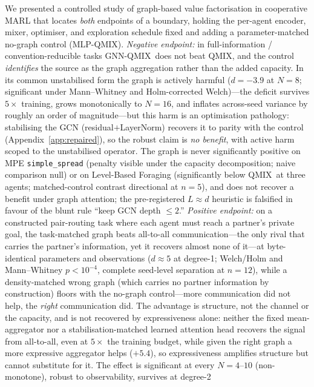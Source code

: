 \documentclass[10pt]{article}
\newcommand{\algoname}[1]{\textsc{#1}}
\newcommand{\qmix}{\algoname{QMIX}}
\newcommand{\gnnqmix}{\algoname{GNN-QMIX}}
\newcommand{\mlpqmix}{\algoname{MLP-QMIX}}
\newcommand{\PEgraphDNeight}{-3.9}    %
\begin{document}
We presented a controlled study of graph-based value factorisation in
cooperative MARL that locates \emph{both} endpoints of a boundary, holding
the per-agent encoder, mixer, optimiser, and exploration schedule fixed and
adding a parameter-matched no-graph control (\mlpqmix). \emph{Negative
endpoint:} in full-information / convention-reducible tasks \gnnqmix\ does not
beat \qmix, and the control \emph{identifies} the source as the graph
aggregation rather than the added capacity. In its common unstabilised form
the graph is actively harmful ($d=\PEgraphDNeight$ at $N{=}8$;
significant under Mann--Whitney and Holm-corrected Welch)---the deficit
survives $5\times$ training, grows monotonically to $N{=}16$, and inflates
across-seed variance by roughly an order of magnitude---but this harm is an
optimisation pathology: stabilising the GCN (residual$+$LayerNorm) recovers
it to parity with the control (Appendix~\ref{app:repaired}), so the robust
claim is \emph{no benefit}, with active harm scoped to the unstabilised
operator. The graph is never significantly positive on MPE
\texttt{simple\_spread} (penalty visible under
the capacity decomposition; naive comparison null) or on Level-Based Foraging
(significantly below \qmix\ at three agents; matched-control contrast
directional at $n{=}5$), and does not recover a benefit under graph
attention; the pre-registered
$L\approx d$ heuristic is falsified in favour of the blunt rule ``keep GCN
depth $\le 2$.'' \emph{Positive endpoint:} on a constructed pair-routing task
where each agent must reach a partner's private goal, the task-matched graph
beats all-to-all communication---the only rival that carries the partner's
information, yet it recovers almost none of it---at byte-identical
parameters and observations
($d\approx5$ at degree-1; Welch/Holm and Mann--Whitney $p<10^{-4}$, complete
seed-level separation at $n{=}12$), while a density-matched wrong graph
(which carries no partner information by construction) floors with the no-graph
control---more communication did not help, the \emph{right} communication did.
The advantage is structure, not the channel or the capacity, and is not
recovered by expressiveness alone: neither the fixed mean-aggregator nor a
stabilisation-matched learned attention head recovers the signal from
all-to-all, even at $5\times$ the training budget, while given the right graph a more expressive
aggregator helps ($+5.4$), so expressiveness amplifies structure but cannot
substitute for it. The effect is significant at every
$N{=}4$--$10$ (non-monotone), robust to observability, survives at degree-2
\end{document}
